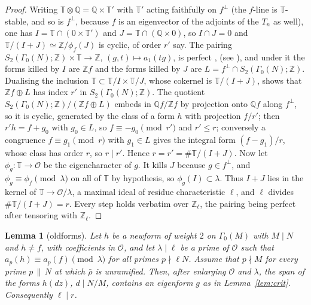 \documentclass[11pt]{amsart}
\newtheorem{lemma}[theorem]{Lemma}
\theoremstyle{definition}
\newcommand{\Q}{\mathbb{Q}}
\newcommand{\Z}{\mathbb{Z}}
\newcommand{\T}{\mathbb{T}}
\begin{document}
\begin{proof}
Writing $\T\otimes\Q=\Q\times\T'$ with $\T'$ acting faithfully on $f^\perp$ (the $f$-line is $\T$-stable, and so is $f^\perp$, because $f$ is an eigenvector of the adjoints of the $T_n$ as well), one has $I=\T\cap(0\times\T')$ and $J=\T\cap(\Q\times0)$, so $I\cap J=0$ and $\T/(I+J)\simeq\Z/\phi_f(J)$ is cyclic, of order $r'$ say. The pairing $S_2(\Gamma_0(N);\Z)\times\T\to\Z$, $(g,t)\mapsto a_1(tg)$, is perfect \cite[Theorem 2.2]{Ribet83}, \cite[Lemma 2.1]{AU96} (see \cite[\S3]{ARS12}), and under it the forms killed by $I$ are $\Z f$ and the forms killed by $J$ are $L=f^\perp\cap S_2(\Gamma_0(N);\Z)$. Dualising the inclusion $\T\subset\T/I\times\T/J$, whose cokernel is $\T/(I+J)$, shows that $\Z f\oplus L$ has index $r'$ in $S_2(\Gamma_0(N);\Z)$. The quotient $S_2(\Gamma_0(N);\Z)/(\Z f\oplus L)$ embeds in $\Q f/\Z f$ by projection onto $\Q f$ along $f^\perp$, so it is cyclic, generated by the class of a form $h$ with projection $f/r'$; then $r'h=f+g_0$ with $g_0\in L$, so $f\equiv-g_0\pmod{r'}$ and $r'\le r$; conversely a congruence $f\equiv g_1\pmod r$ with $g_1\in L$ gives the integral form $(f-g_1)/r$, whose class has order $r$, so $r\mid r'$. Hence $r=r'=\#\T/(I+J)$. Now let $\phi_g\colon\T\to\mathcal{O}$ be the eigencharacter of $g$. It kills $J$ because $g\in f^\perp$, and $\phi_g\equiv\phi_f\pmod\lambda$ on all of $\T$ by hypothesis, so $\phi_g(I)\subset\lambda$. Thus $I+J$ lies in the kernel of $\T\to\mathcal{O}/\lambda$, a maximal ideal of residue characteristic $\ell$, and $\ell$ divides $\#\T/(I+J)=r$. Every step holds verbatim over $\Z_\ell$, the pairing being perfect after tensoring with $\Z_\ell$.
\end{proof}

\begin{lemma}[oldforms]\label{lem:old}
Let $h$ be a newform of weight $2$ on $\Gamma_0(M)$ with $M\mid N$ and $h\ne f$, with coefficients in $\mathcal{O}$, and let $\lambda\mid\ell$ be a prime of $\mathcal{O}$ such that $a_p(h)\equiv a_p(f)\pmod\lambda$ for all primes $p\nmid\ell N$. Assume that $p\nmid M$ for every prime $p\,\|\,N$ at which $\bar\rho$ is unramified. Then, after enlarging $\mathcal{O}$ and $\lambda$, the span of the forms $h(dz)$, $d\mid N/M$, contains an eigenform $g$ as in Lemma~\ref{lem:crit}. Consequently $\ell\mid r$.
\end{lemma}
\end{document}

